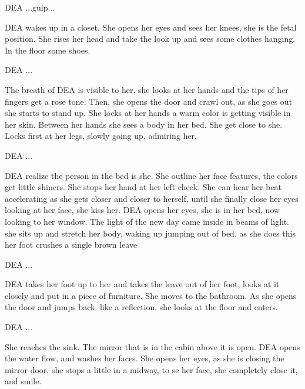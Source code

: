 \documentclass{screenplay}[2012/06/30]
\begin{document}
\begin{dialogue}{DEA}
    ...gulp...
\end{dialogue}
\intercut
{}
DEA wakes up in a closet. She opens her eyes and sees her knees, she is the fetal position.
She rises her head and take the look up and 
sees some clothes hanging. In the floor some shoes.
\begin{dialogue}[Exhalates]{DEA}
    ...
\end{dialogue}
The breath of DEA is visible to her, she looks at her hands and
the tips of her fingers get a rose tone. Then, she opens the door and
crawl out, as she goes out she starts to stand up. She locks at her hands
a warm color is getting visible in her skin. Between her hands she sees
a body in her bed. She get close to she. Locks first at her legs, slowly 
going up, admiring her.
\begin{dialogue}{DEA}
    ...
\end{dialogue}
DEA realize the person in the bed is she. 
She outline her face features, the colors get little shiners. She stops her hand at her left cheek.
She can hear her beat accelerating as she 
gets closer and closer to herself, until she finally close her eyes looking at her face,
she kiss her.
\intercut
{}
DEA opens her eyes, she is in her bed, now looking to her window.
The light of the new day came inside in beams of light. she sits up and stretch her body,
waking up jumping out of bed, as she does this her foot crushes a single brown leave
\begin{dialogue}{DEA}
    ...
\end{dialogue}
DEA takes her foot up to her and takes the leave out of her foot, looks at it
closely and put in a piece of furniture. She moves to the bathroom. As she opens the door
and jumps back, like a reflection, she looks at the floor and enters.
\begin{dialogue}[Laughfing]{DEA}
    ...
\end{dialogue}
She reaches the sink. The mirror that is in the cabin above it is open.
DEA opens the water flow, and washes her faces. She opens her eyes, as she is closing the mirror door,
she stops a little in a midway, to se her face, she completely close it, and smile.
\end{document}
